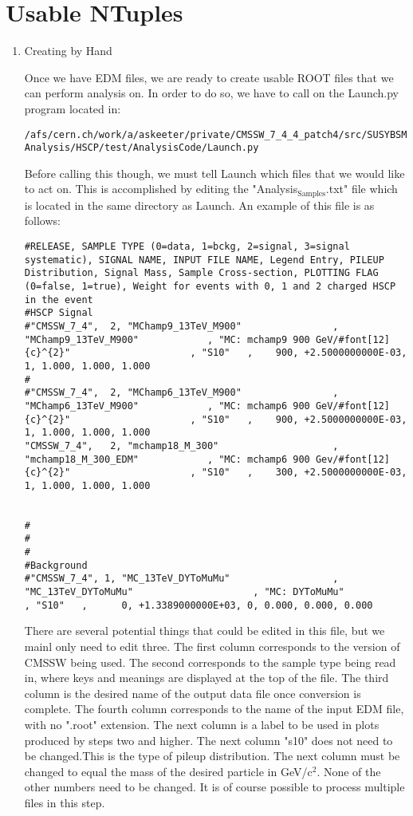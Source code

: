 \documentclass[11 pt , letterpaper , twoside , openright]{book}
\begin{document}
\section{Usable NTuples}
\label{sec-1-1-4}
\begin{enumerate}
\item Creating by Hand
\label{sec-1-1-4-1}

Once we have EDM files, we are ready to create usable ROOT files
that we can perform analysis on. In order to do so, we have to
call on the Launch.py program located in:

\texttt{/afs/cern.ch/work/a/askeeter/private/CMSSW\_7\_4\_4\_patch4/src/SUSYBSMAnalysis/HSCP/test/AnalysisCode/Launch.py}

Before calling this though, we must tell Launch which files that
we would like to act on. This is accomplished by editing the
"Analysis$_{\text{Samples}}$.txt" file which is located in the same directory
as Launch. An example of this file is as follows:

\begin{verbatim}
#RELEASE, SAMPLE TYPE (0=data, 1=bckg, 2=signal, 3=signal systematic), SIGNAL NAME, INPUT FILE NAME, Legend Entry, PILEUP Distribution, Signal Mass, Sample Cross-section, PLOTTING FLAG (0=false, 1=true), Weight for events with 0, 1 and 2 charged HSCP in the event
#HSCP Signal
#"CMSSW_7_4",  2, "MChamp9_13TeV_M900"                , "MChamp9_13TeV_M900"            , "MC: mchamp9 900 GeV/#font[12]{c}^{2}"                     , "S10"   ,    900, +2.5000000000E-03, 1, 1.000, 1.000, 1.000
#
#"CMSSW_7_4",  2, "MChamp6_13TeV_M900"                , "MChamp6_13TeV_M900"            , "MC: mchamp6 900 GeV/#font[12]{c}^{2}"                     , "S10"   ,    900, +2.5000000000E-03, 1, 1.000, 1.000, 1.000
"CMSSW_7_4",   2, "mchamp18_M_300"                    , "mchamp18_M_300_EDM"            , "MC: mchamp6 900 Gev/#font[12]{c}^{2}"                     , "S10"   ,    300, +2.5000000000E-03, 1, 1.000, 1.000, 1.000


#
#
#
#Background
#"CMSSW_7_4", 1, "MC_13TeV_DYToMuMu"                  , "MC_13TeV_DYToMuMu"                     , "MC: DYToMuMu"                            , "S10"   ,      0, +1.3389000000E+03, 0, 0.000, 0.000, 0.000
\end{verbatim}

There are several potential things that could be edited in this
file, but we mainl only need to edit three. The first column
corresponds to the version of CMSSW being used. The second
corresponds to the sample type being read in, where keys and
meanings are displayed at the top of the file. The third column is
the desired name of the output data file once conversion is
complete. The fourth column corresponds to the name of the input
EDM file, with no ".root" extension. The next column is a label
to be used in plots produced by steps two and higher. The next
column "s10" does not need to be changed.This is the type of
pileup distribution. The next column must be changed to equal the
mass of the desired particle in GeV/c$^{\text{2}}$. None of the other numbers
need to be changed. It is of course possible to process multiple
files in this step. 


\end{enumerate}
\end{document}
